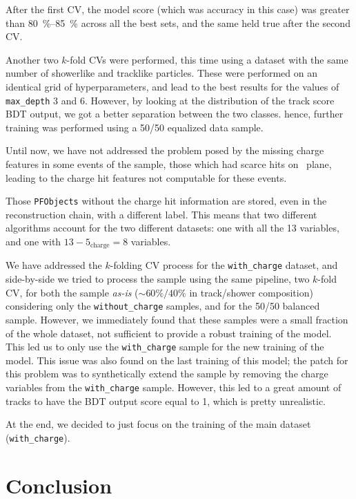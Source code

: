 After the first CV, the model score (which was accuracy in this case) was greater than \qtyrange{80}{85}{\percent} across all the best sets, and the same held true after the second CV. 

Another two $k$-fold CVs were performed, this time using a dataset with the same number of showerlike and tracklike particles. These were performed on an identical grid of hyperparameters, and lead to the best results for the values of \verb=max_depth= 3 and 6. However, by looking at the distribution of the track score BDT output, we got a better separation between the two classes. hence, further training was performed using a 50/50 equalized data sample.

Until now, we have not addressed the problem posed by the missing charge features in some events of the sample, those which had scarce hits on \ind\ plane, leading to the charge hit features not computable for these events. 

Those \texttt{PFObjects} without the charge hit information are stored, even in the reconstruction chain, with a different label. This means that two different algorithms account for the two different datasets: one with all the 13 variables, and one with $13-5_\text{charge} = 8$ variables. 

We have addressed the $k$-folding CV process for the \texttt{with\_charge} dataset, and side-by-side we tried to process the sample using the same pipeline, two $k$-fold CV, for both the sample \emph{as-is} ($\sim 60\%/40\%$ in track/shower composition) considering only the \texttt{without\_charge} samples, and for the 50/50 balanced sample. However, we immediately found that these samples were a small fraction of the whole dataset, not sufficient to provide a robust training of the model. This led us to only use the \texttt{with\_charge} sample for the new training of the model. This issue was also found on the last training of this model; the patch for this problem was to synthetically extend the sample by removing the charge variables from the \texttt{with\_charge} sample. However, this led to a great amount of tracks to have the BDT output score equal to 1, which is pretty unrealistic. 

At the end, we decided to just focus on the training of the main dataset (\texttt{with\_charge}). 

\section{Conclusion}\label{sec:conclusion}

